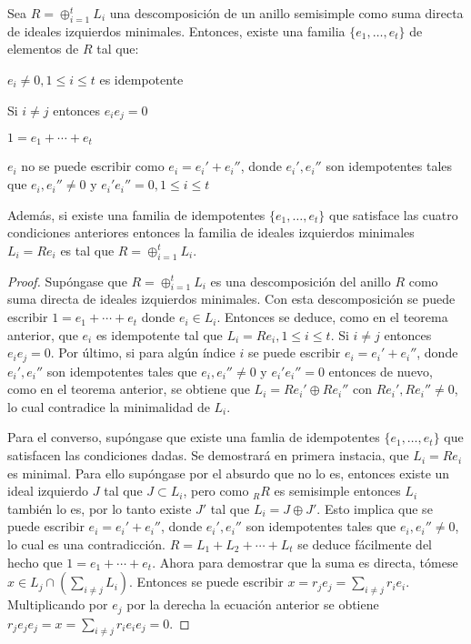 \begin{teorema}\label{teo:familiaIdempotentes}
Sea $R = \oplus_{i = 1}^t L_i$ una descomposición de un anillo semisimple como suma directa de ideales izquierdos minimales. Entonces, existe una familia $\{e_1, \dots, e_t \}$ de elementos de $R$ tal que:
\begin{bulletList}
\item\label{item:orto1} $e_i \neq 0, 1 \leq i \leq t$ es idempotente
\item\label{item:orto2} Si $i \neq j$ entonces $e_ie_j = 0$
\item\label{item:orto3} $1 = e_1 + \cdots + e_t$
\item\label{item:orto4} $e_i$ no se puede escribir como $e_i = e_i'+ e_i''$, donde $e_i', e_i''$ son idempotentes tales que $e_i, e_i'' \neq 0$ y $e_i'e_i''=0, 1\leq i \leq t$
\end{bulletList}
Además, si existe una familia de idempotentes $\{e_1, \dots, e_t \}$ que satisface las cuatro condiciones anteriores entonces la familia de ideales izquierdos minimales $L_i = Re_i$ es tal que $R = \oplus_{i=1}^tL_i$.
\end{teorema}
\begin{proof}
Supóngase que $R = \oplus_{i = 1}^tL_i$ es una descomposición del anillo $R$ como suma directa de ideales izquierdos minimales. Con esta descomposición se puede escribir $1 = e_1 + \cdots + e_t$ donde $e_i \in L_i$. Entonces se deduce, como en el teorema anterior, que $e_i$ es idempotente tal que $L_i = Re_i, 1 \leq i \leq t$. Si $i \neq j$ entonces $e_ie_j = 0$. Por último, si para algún índice $i$ se puede escribir $e_i = e_i'+ e_i''$, donde $e_i', e_i''$ son idempotentes tales que $e_i, e_i'' \neq 0$ y $e_i'e_i''=0$ entonces de nuevo, como en el teorema anterior, se obtiene que $L_i = Re_i'\oplus Re_i''$ con $Re_i', Re_i'' \neq 0$, lo cual contradice la minimalidad de $L_i$. 

Para el converso, supóngase que existe una famlia de idempotentes $\{ e_1, \dots, e_t \}$ que satisfacen las condiciones dadas. Se demostrará en primera instacia, que $L_i = Re_i$ es minimal. Para ello supóngase por el absurdo que no lo es, entonces existe un ideal izquierdo $J$ tal que $J \subset L_i$, pero como $_RR$ es semisimple entonces $L_i$ también lo es, por lo tanto existe $J'$ tal que $L_i = J\oplus J'$. Esto implica que se puede escribir $e_i = e_i'+ e_i''$, donde $e_i', e_i''$ son idempotentes tales que $e_i, e_i'' \neq 0$, lo cual es una contradicción.
$R = L_1 + L_2 + \cdots + L_t$ se deduce fácilmente del hecho que $1 = e_1 + \cdots + e_t$. Ahora para demostrar que la suma es directa, tómese $x \in L_j \cap \left( \sum_{i \neq j}L_i \right)$. Entonces se puede escribir $x = r_je_j = \sum_{i \neq j}r_ie_i$. Multiplicando por $e_j$ por la derecha la ecuación anterior se obtiene $r_je_je_j = x = \sum_{i \neq j}r_ie_ie_j = 0$.
\end{proof}
